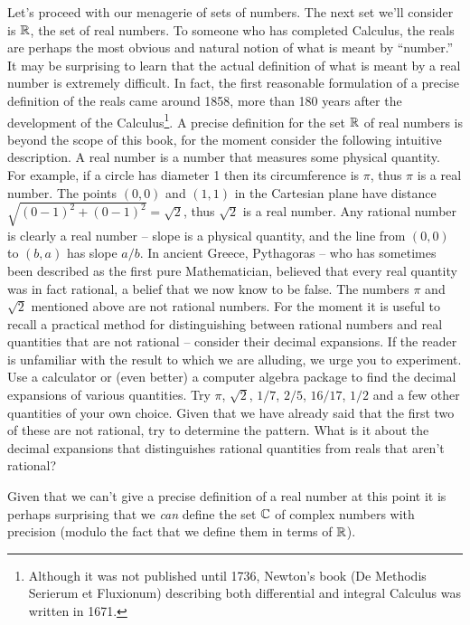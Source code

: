 Let's proceed with our menagerie of sets of numbers.  The next set
we'll consider is ${\mathbb R}$, the set of real numbers.  To someone
who has completed Calculus, the reals are perhaps the most obvious and
natural notion of what is meant by ``number.''  It may be surprising to
learn that the actual definition of what is meant by a real number is
extremely difficult.  In fact, the first reasonable formulation of a
precise definition of the reals came around 1858, more than 180 years
after the development of the 
Calculus\footnote{Although it was not
  published until 1736, Newton's book (De Methodis Serierum et
  Fluxionum) describing both differential and integral Calculus was
  written in 1671.}.  A precise 
definition for the set ${\mathbb R}$ of real numbers is 
beyond the scope of this book, for the moment consider the
following intuitive description.  A real number is a number that 
measures some physical quantity.  For example, if a circle has
diameter 1 then its circumference is $\pi$, thus $\pi$ is a real
number.  The points $(0,0)$ and $(1,1)$ in the Cartesian plane have
distance $\sqrt{ (0-1)^2 + (0-1)^2} = \sqrt{2}$, thus $\sqrt{2}$ is 
a real number.  Any rational number is clearly a real number -- slope
is a physical quantity, and the line from $(0,0)$ to $(b,a)$ has slope
$a/b$.  In ancient Greece, Pythagoras -- who has sometimes been
described as the first pure Mathematician, believed that 
every real quantity was in fact rational, a belief that we now know to
be false.  The numbers $\pi$ and $\sqrt{2}$ mentioned above are not
rational numbers.  For the moment it is useful to recall a practical
method for distinguishing between rational numbers and real quantities
that are not rational -- consider their decimal expansions.  If the
reader is unfamiliar with the result to which we are alluding, we urge
you to experiment.  Use a calculator or (even better) a computer
algebra package to find the decimal expansions of various quantities.
Try $\pi$, $\sqrt{2}$, $1/7$, $2/5$, $16/17$, $1/2$ and a few other
quantities of your own choice.  Given that we have already said that the first
two of these are not rational, try to determine the pattern.  What is 
it about the decimal expansions
that distinguishes rational quantities from reals that aren't rational?

Given that we can't give a precise definition of a real number at this
point it is perhaps surprising that we {\em can} define the set
${\mathbb C}$ of complex numbers with precision 
(modulo the fact that we define them in terms of ${\mathbb R}$).  

